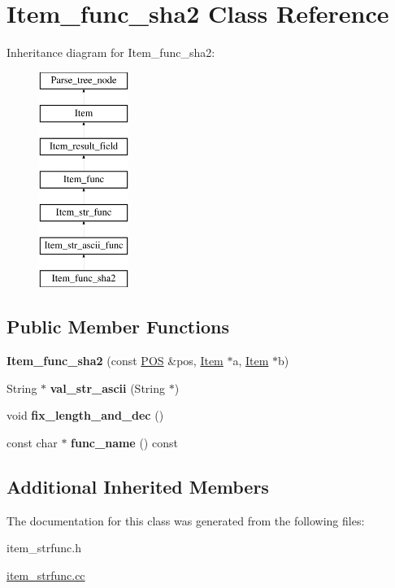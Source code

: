 \hypertarget{classItem__func__sha2}{}\section{Item\+\_\+func\+\_\+sha2 Class Reference}
\label{classItem__func__sha2}
Inheritance diagram for Item\+\_\+func\+\_\+sha2\+:\begin{figure}[H]
\begin{center}
\leavevmode
\includegraphics[height=7.000000cm]{classItem__func__sha2}
\end{center}
\end{figure}
\subsection*{Public Member Functions}
\begin{DoxyCompactItemize}
\item 
\mbox{\label{classItem__func__sha2_a92bd98c194188a724482e0b30c029512}} 
{\bfseries Item\+\_\+func\+\_\+sha2} (const \mbox{\hyperlink{structYYLTYPE}{P\+OS}} \&pos, \mbox{\hyperlink{classItem}{Item}} $\ast$a, \mbox{\hyperlink{classItem}{Item}} $\ast$b)
\item 
\mbox{\label{classItem__func__sha2_a93261bc9d90f843b8cc7c8ed2b3a34ea}} 
String $\ast$ {\bfseries val\+\_\+str\+\_\+ascii} (String $\ast$)
\item 
\mbox{\label{classItem__func__sha2_ae7c98937e8a0596de92d58b736d90dc4}} 
void {\bfseries fix\+\_\+length\+\_\+and\+\_\+dec} ()
\item 
\mbox{\label{classItem__func__sha2_a66892748d1393e94141084a02499b60e}} 
const char $\ast$ {\bfseries func\+\_\+name} () const
\end{DoxyCompactItemize}
\subsection*{Additional Inherited Members}


The documentation for this class was generated from the following files\+:\begin{DoxyCompactItemize}
\item 
item\+\_\+strfunc.\+h\item 
\mbox{\hyperlink{item__strfunc_8cc}{item\+\_\+strfunc.\+cc}}\end{DoxyCompactItemize}
